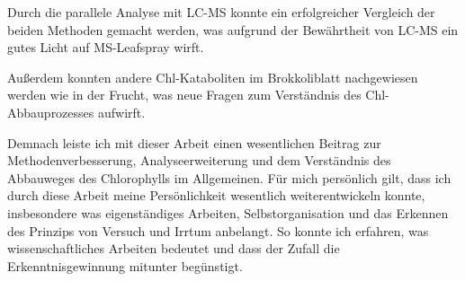 Durch die parallele Analyse mit LC-MS konnte ein erfolgreicher Vergleich der beiden Methoden gemacht werden, was aufgrund der Bewährtheit von LC-MS ein gutes Licht auf MS-Leafspray wirft.

Außerdem konnten andere Chl-Kataboliten im Brokkoliblatt nachgewiesen werden wie in der Frucht, was neue Fragen zum Verständnis des Chl-Abbauprozesses aufwirft.

Demnach leiste ich mit dieser Arbeit einen wesentlichen Beitrag zur Methodenverbesserung, Analyseerweiterung und dem Verständnis des Abbauweges des Chlorophylls im Allgemeinen. Für mich persönlich gilt, dass ich durch diese Arbeit meine Persönlichkeit wesentlich weiterentwickeln konnte, insbesondere was eigenständiges Arbeiten, Selbstorganisation und das Erkennen des Prinzips von Versuch und Irrtum anbelangt. So konnte ich erfahren, was wissenschaftliches Arbeiten bedeutet und dass der Zufall die Erkenntnisgewinnung mitunter begünstigt.